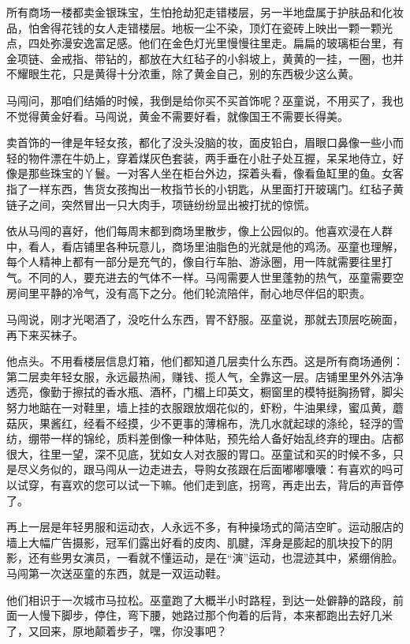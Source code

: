 \documentclass[lang=cn,newtx,12pt,scheme=chinese]{elegantbook}
\begin{document}
所有商场一楼都卖金银珠宝，生怕抢劫犯走错楼层，另一半地盘属于护肤品和化妆品，怕舍得花钱的女人走错楼层。地板一尘不染，顶灯在瓷砖上映出一颗一颗光点，四处弥漫安逸富足感。他们在金色灯光里慢慢往里走。扁扁的玻璃柜台里，有金项链、金戒指、带钻的，都放在大红毡子的小斜坡上，黄黄的一挂，一圈，也并不耀眼生花，只是黄得十分浓重，除了黄金自己，别的东西极少这么黄。

马闯问，那咱们结婚的时候，我倒是给你买不买首饰呢？巫童说，不用买了，我也不觉得黄金好看。马闯说，黄金不需要好看，就像国王不需要长得美。

卖首饰的一律是年轻女孩，都化了没头没脑的妆，面皮铅白，眉眼口鼻像一些小而轻的物件漂在牛奶上，穿着煤灰色套装，两手垂在小肚子处互握，呆呆地侍立，好像是那些珠宝的丫鬟。一对客人坐在柜台外边，探着头看，像看鱼缸里的鱼。女客指了一样东西，售货女孩掏出一枚指节长的小钥匙，从里面打开玻璃门。红毡子黄链子之间，突然冒出一只大肉手，项链纷纷显出被打扰的惊慌。

依从马闯的喜好，他们每周末都到商场里散步，像上公园似的。他喜欢浸在人群中，看人，看店铺里各种玩意儿，商场里油脂色的光就是他的鸡汤。巫童也理解，每个人精神上都有一部分是充气的，像自行车胎、游泳圈，用一阵就需要往里打气。不同的人，要充进去的气体不一样。马闯需要人世里蓬勃的热气，巫童需要空房间里平静的冷气，没有高下之分。他们轮流陪伴，耐心地尽伴侣的职责。

马闯说，刚才光喝酒了，没吃什么东西，胃不舒服。巫童说，那就去顶层吃碗面，再下来买袜子。

他点头。不用看楼层信息灯箱，他们都知道几层卖什么东西。这是所有商场通例：第二层卖年轻女服，永远最热闹，赚钱、揽人气，全靠这一层。店铺里里外外洁净透亮，像勤于擦拭的香水瓶、酒杯，门楣上印英文，橱窗里的模特挺胸扬臂，脚尖努力地踮在一对鞋里，墙上挂的衣服跟放烟花似的，虾粉，牛油果绿，蜜瓜黄，蘑菇灰，果酱红，经看不经摸，少不更事的薄棉布，洗几水就起球的涤纶，轻浮的雪纺，绷带一样的锦纶，质料差倒像一种体贴，预先给人备好始乱终弃的理由。店都很大，往里一望，深不见底，犹如女人对衣服的胃口。巫童试和买的时候不多，只是尽义务似的，跟马闯从一边走进去，导购女孩跟在后面嘟嘟囔囔：有喜欢的吗可以试穿，有喜欢的您可以试一下嘛。他们走到底，拐弯，再走出去，背后的声音停了。

再上一层是年轻男服和运动衣，人永远不多，有种操场式的简洁空旷。运动服店的墙上大幅广告摄影，冠军们露出好看的皮肉、肌腱，浑身是膨起的肌块投下的阴影，还有些男女演员，一看就不懂运动，是在“演”运动，也混迹其中，紧绷俏脸。马闯第一次送巫童的东西，就是一双运动鞋。

他们相识于一次城市马拉松。巫童跑了大概半小时路程，到达一处僻静的路段，前面一人慢下脚步，停住，弯下腰，她路过那个佝着的后背，本来都跑出去好几米了，又回来，原地颠着步子，嘿，你没事吧？
\end{document}
